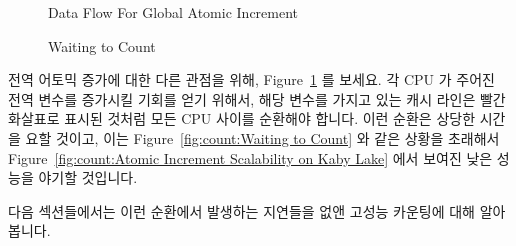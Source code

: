 \begin{figure}[tb]
\centering
{}
\caption{Data Flow For Global Atomic Increment}
\label{fig:count:Data Flow For Global Atomic Increment}
\end{figure}

\begin{figure}[tb]
\centering
{}
\caption{Waiting to Count}
\end{figure}

전역 어토믹 증가에 대한 다른 관점을 위해,
Figure~\ref{fig:count:Data Flow For Global Atomic Increment} 를 보세요.
각 CPU 가 주어진 전역 변수를 증가시킬 기회를 얻기 위해서, 해당 변수를 가지고
있는 캐시 라인은 빨간 화살표로 표시된 것처럼 모든 CPU 사이를 순환해야 합니다.
이런 순환은 상당한 시간을 요할 것이고, 이는
Figure~\ref{fig:count:Waiting to Count} 와 같은 상황을 초래해서
Figure~\ref{fig:count:Atomic Increment Scalability on Kaby Lake} 에서 보여진 낮은
성능을 야기할 것입니다.

다음 섹션들에서는 이런 순환에서 발생하는 지연들을 없앤 고성능 카운팅에 대해
알아봅니다.

